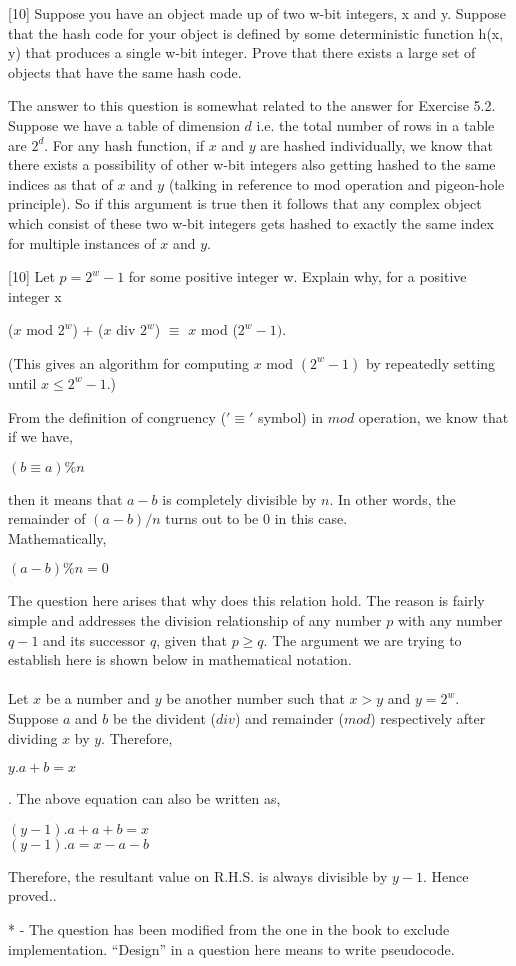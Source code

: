 \documentclass[addpoints]{exam}
\begin{document}
\begin{questions}
		[10]
		Suppose you have an object made up of two w-bit integers, x and y. Suppose that the hash code for your object is defined by some deterministic function h(x, y) that produces a single w-bit integer. Prove that there exists a large set of objects that have the same hash code.
		\begin{solution}
			The answer to this question is somewhat related to the answer for Exercise 5.2. Suppose we have a table of dimension $d$ i.e. the total number of rows in a table are $2^d$. For any hash function, if $x$ and $y$ are hashed individually, we know that there exists a possibility of other w-bit integers also getting hashed to the same indices as that of $x$ and $y$ (talking in reference to mod operation and pigeon-hole principle). So if this argument is true then it follows that any complex object which consist of these two w-bit integers gets hashed to exactly the same index for multiple instances of $x$ and $y$. 
		\end{solution}
\pagebreak
		
		[10]
		Let $p = 2^w - 1$ for some positive integer w. Explain why, for a positive integer x
		\begin{center}
			($x$ mod $2^w$) + ($x$ div $2^w$) $\equiv$ $x$ mod ($2^w - 1)$.
		\end{center}
		(This gives an algorithm for computing $x$ mod $(2^w - 1)$ by repeatedly setting until $x \leq 2^w - 1$.)
		\begin{solution}
			From the definition of congruency ($'\equiv'$ symbol) in $mod$ operation, we know that if we have, 
			\begin{center}
				$(b \equiv a)\%n$
			\end{center}
			then it means that $a-b$ is completely divisible by $n$. In other words, the remainder of $(a-b)/n$ turns out to be $0$ in this case.\\
			Mathematically, 
			\begin{center}
				$(a-b)\%n = 0$
			\end{center}
			The question here arises that why does this relation hold. The reason is fairly simple and addresses the division relationship of any number $p$ with any number $q-1$ and its successor $q$, given that $p \geq q$. The argument we are trying to establish here is shown below in mathematical notation. \\ \\
			Let $x$ be a number and $y$ be another number such that $x > y$ and $y = {2^w}$. Suppose $a$ and $b$ be the divident ($div$) and remainder ($mod$) respectively after dividing $x$ by $y$. Therefore, \begin{center}$y.a + b = x$\end{center}.
			The above equation can also be written as, 
			\begin{center}$(y-1).a + a + b = x$\\ $(y-1).a = x - a - b$\end{center}
			Therefore, the resultant value on R.H.S. is always divisible by $y-1$. Hence proved..
		\end{solution}
	
	\end{questions}

* - The question has been modified from the one in the book to exclude implementation. ``Design'' in a question here means to write pseudocode.
\end{document}
